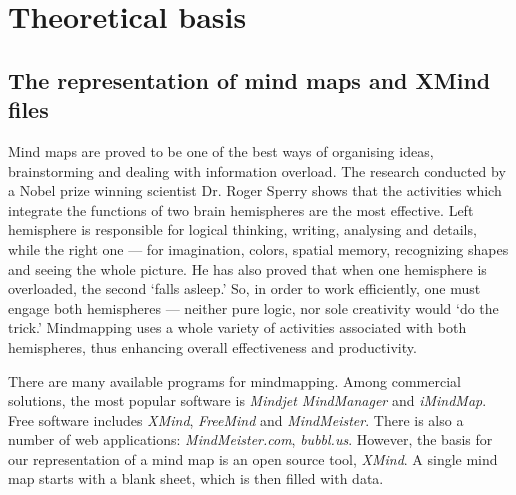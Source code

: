 %
%
%
%
%

\chapter{Theoretical basis}
\label{chap:theory}

\section{The representation of mind maps and XMind files}
\label{sec:xmind}

Mind maps are proved to be one of the best ways of organising ideas, brainstorming and dealing with information overload. The research conducted by a Nobel prize winning scientist Dr. Roger Sperry shows that the activities which integrate the functions of two brain hemispheres are the most effective. \cite{Voneida:1998:Sperry} Left hemisphere is responsible for logical thinking, writing, analysing and details, while the right one --- for imagination, colors, spatial memory, recognizing shapes and seeing the whole picture. He has also proved that when one hemisphere is overloaded, the second `falls asleep.' So, in order to work efficiently, one must engage both hemispheres --- neither pure logic, nor sole creativity would `do the trick.' Mindmapping uses a whole variety of activities associated with both hemispheres, thus enhancing overall effectiveness and productivity.

There are many available programs for mindmapping. Among commercial solutions, the most popular software is {\em Mindjet MindManager} and {\em iMindMap}. Free software includes {\em XMind}, {\em FreeMind} and \emph{MindMeister}. \cite{Wiki:Software} There is also a number of web applications: \emph{MindMeister.com}, \emph{bubbl.us}. However, the basis for our representation of a mind map is an open source tool, {\em XMind}. A single mind map starts with a blank sheet, which is then filled with data.

